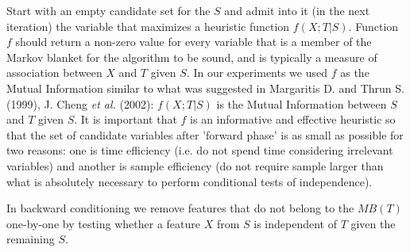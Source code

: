 Start with an empty candidate set for the $S$ and admit into it (in the next iteration) the variable that maximizes a heuristic function $f(X ; T|S)$. Function $f$ should return a non-zero value for every variable that is a member of the Markov blanket for the algorithm to be sound, and is typically a measure of association between $X$ and $T$ given $S$. In our experiments we used $f$ as the Mutual Information similar to what was suggested in Margaritis D. and Thrun S. (1999), J. Cheng \emph{et al.} (2002): $f(X; T|S)$ is the Mutual Information between $S$ and $T$ given $S$. It is important that $f$ is an informative and effective heuristic so that the set of candidate variables after 'forward phase' is as small as possible for two reasons: one is time efficiency (i.e. do not spend time considering irrelevant variables) and another is sample efficiency (do not require sample larger than what is absolutely necessary to perform conditional tests of independence).

In backward conditioning we remove features that do not belong to the $MB(T)$ one-by-one by testing whether a feature $X$ from $S$ is independent of $T$ given the remaining $S$.